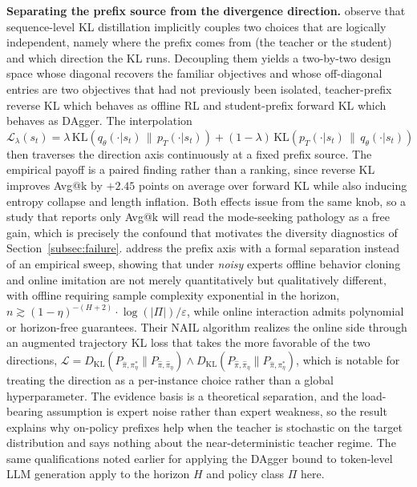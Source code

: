 \documentclass{article} %
\begin{document}
\textbf{Separating the prefix source from the divergence direction.} \citet{2605.16826} observe that sequence-level KL distillation implicitly couples two choices that are logically independent, namely where the prefix comes from (the teacher or the student) and which direction the KL runs. Decoupling them yields a two-by-two design space whose diagonal recovers the familiar objectives and whose off-diagonal entries are two objectives that had not previously been isolated, teacher-prefix reverse KL which behaves as offline RL and student-prefix forward KL which behaves as DAgger. The interpolation $\mathcal{L}_\lambda(s_t) = \lambda\,\mathrm{KL}(q_\theta(\cdot|s_t) \,\|\, p_T(\cdot|s_t)) + (1-\lambda)\,\mathrm{KL}(p_T(\cdot|s_t) \,\|\, q_\theta(\cdot|s_t))$ then traverses the direction axis continuously at a fixed prefix source. The empirical payoff is a paired finding rather than a ranking, since reverse KL improves Avg@k by $+2.45$ points on average over forward KL while also inducing entropy collapse and length inflation. Both effects issue from the same knob, so a study that reports only Avg@k will read the mode-seeking pathology as a free gain, which is precisely the confound that motivates the diversity diagnostics of Section~\ref{subsec:failure}. \citet{2606.30923} address the prefix axis with a formal separation instead of an empirical sweep, showing that under \emph{noisy} experts offline behavior cloning and online imitation are not merely quantitatively but qualitatively different, with offline requiring sample complexity exponential in the horizon, $n \gtrsim (1-\eta)^{-(H+2)} \cdot \log(|\Pi|)/\varepsilon$, while online interaction admits polynomial or horizon-free guarantees. Their NAIL algorithm realizes the online side through an augmented trajectory KL loss that takes the more favorable of the two directions, $\mathcal{L} = D_{\mathrm{KL}}(P_{\hat{\pi},\pi^*_\eta} \| P_{\hat{\pi},\hat{\pi}_\eta}) \wedge D_{\mathrm{KL}}(P_{\hat{\pi},\hat{\pi}_\eta} \| P_{\hat{\pi},\pi^*_\eta})$, which is notable for treating the direction as a per-instance choice rather than a global hyperparameter. The evidence basis is a theoretical separation, and the load-bearing assumption is expert noise rather than expert weakness, so the result explains why on-policy prefixes help when the teacher is stochastic on the target distribution and says nothing about the near-deterministic teacher regime. The same qualifications noted earlier for applying the DAgger bound to token-level LLM generation apply to the horizon $H$ and policy class $\Pi$ here.
\end{document}
